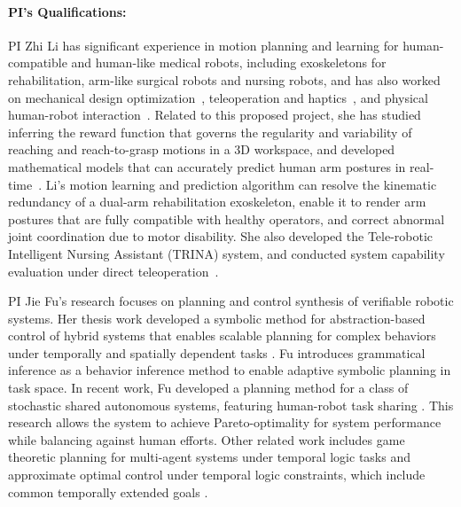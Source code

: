 \documentclass[letterpaper, 11 pt, onecolumn]{article}
\begin{document}
\paragraph*{PI's Qualifications:}
PI Zhi Li has significant experience in motion planning and learning for human-compatible and human-like medical robots, including exoskeletons for rehabilitation, arm-like surgical robots and nursing robots, and has also worked on mechanical design optimization~\cite{li2016design}, teleoperation and haptics~\cite{li2009networked,li2009remote}, and physical human-robot interaction~\cite{Hauser_Li_BiTelepresence:17}. Related to this proposed project, she has studied inferring the reward function that governs
the regularity and variability of reaching and reach-to-grasp motions in a 3D workspace, and developed mathematical models that can accurately predict human arm postures in real-time~\cite{kim2012resolving,Rosen_Li_EMBC:13,Rosen_Li_IROSChapt:13,Rosen_Li_IROS:14,Rosen_Li_J:14, li2017reaching}. Li's motion learning and prediction algorithm can resolve the kinematic redundancy of a dual-arm rehabilitation exoskeleton, enable it to render arm postures that are fully compatible with healthy operators, and correct abnormal joint coordination due to motor disability. She also developed the Tele-robotic Intelligent Nursing Assistant (TRINA) system, and conducted system capability evaluation under direct teleoperation~\cite{Hauser_Li_TRINA:17}.

PI Jie Fu's research focuses on planning and control synthesis of verifiable robotic systems. Her thesis work developed a symbolic method for abstraction-based control of hybrid systems that enables scalable planning for complex behaviors under temporally and spatially dependent tasks \cite{fu2013bottom}. Fu introduces grammatical inference \cite{fu2014adaptive} as a behavior inference method to enable adaptive symbolic planning in task space. In recent work, Fu developed a  planning method for a class of stochastic shared autonomous systems, featuring  human-robot task sharing \cite{fu2016synthesis}. This research allows the system to achieve Pareto-optimality for system  performance while balancing against human efforts. Other related  work  includes game theoretic planning for multi-agent systems under  temporal logic tasks \cite{fu2015concurrent} and approximate optimal control under temporal logic constraints, which include common temporally extended goals \cite{fu2017sampling}.
\end{document}
